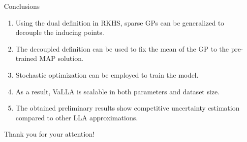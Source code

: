 \documentclass[aspectratio=149]{beamer}
\begin{document}
    \begin{frame}{Conclusions}
        \begin{enumerate}[<+->]
            \item Using the dual definition in RKHS, sparse GPs can be generalized to decouple the inducing points.
            \item The decoupled definition can be used to fix the mean of the GP to the pre-trained MAP solution.
            \item Stochastic optimization can be employed to train the model.
            \item As a result, VaLLA is scalable in both parameters and dataset size.
            \item The obtained preliminary results show competitive uncertainty estimation compared to other LLA approximations.
        \end{enumerate}
    \end{frame}

    \begin{frame}[standout]
        Thank you for your attention!
    \end{frame}

\begin{frame}[allowframebreaks]
\nocite{*}
\printbibliography[heading=none]
\end{frame}
\end{document}

